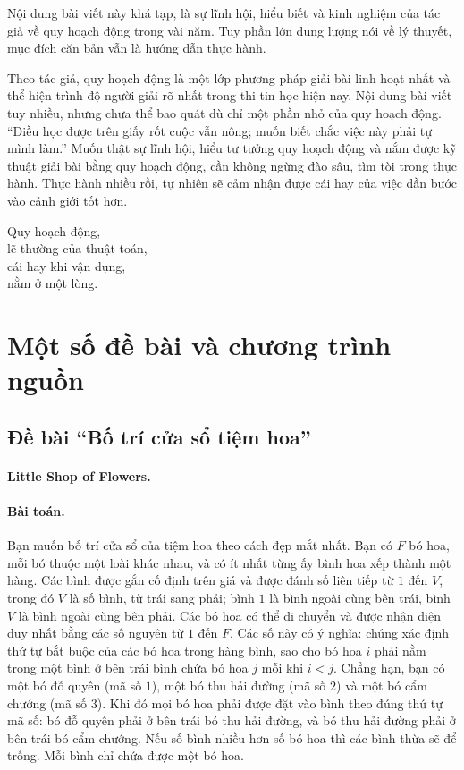 \documentclass[11pt]{article}
\begin{document}
Nội dung bài viết này khá tạp, là sự lĩnh hội, hiểu biết và kinh nghiệm của
tác giả về quy hoạch động trong vài năm. Tuy phần lớn dung lượng nói về lý
thuyết, mục đích căn bản vẫn là hướng dẫn thực hành.

Theo tác giả, quy hoạch động là một lớp phương pháp giải bài linh hoạt nhất
và thể hiện trình độ người giải rõ nhất trong thi tin học hiện nay. Nội dung
bài viết tuy nhiều, nhưng chưa thể bao quát dù chỉ một phần nhỏ của quy hoạch
động. ``Điều học được trên giấy rốt cuộc vẫn nông; muốn biết chắc việc này
phải tự mình làm.'' Muốn thật sự lĩnh hội, hiểu tư tưởng quy hoạch động và
nắm được kỹ thuật giải bài bằng quy hoạch động, cần không ngừng đào sâu, tìm
tòi trong thực hành. Thực hành nhiều rồi, tự nhiên sẽ cảm nhận được cái hay
của việc dần bước vào cảnh giới tốt hơn.

\begin{center}
Quy hoạch động,\\
lẽ thường của thuật toán,\\
cái hay khi vận dụng,\\
nằm ở một lòng.
\end{center}

\appendix
\section{Một số đề bài và chương trình nguồn}

\subsection{Đề bài ``Bố trí cửa sổ tiệm hoa''}

\paragraph{Little Shop of Flowers.}

\paragraph{Bài toán.}
Bạn muốn bố trí cửa sổ của tiệm hoa theo cách đẹp mắt nhất. Bạn có \(F\) bó
hoa, mỗi bó thuộc một loài khác nhau, và có ít nhất từng ấy bình hoa xếp
thành một hàng. Các bình được gắn cố định trên giá và được đánh số liên tiếp
từ \(1\) đến \(V\), trong đó \(V\) là số bình, từ trái sang phải; bình \(1\)
là bình ngoài cùng bên trái, bình \(V\) là bình ngoài cùng bên phải. Các bó
hoa có thể di chuyển và được nhận diện duy nhất bằng các số nguyên từ \(1\)
đến \(F\). Các số này có ý nghĩa: chúng xác định thứ tự bắt buộc của các bó
hoa trong hàng bình, sao cho bó hoa \(i\) phải nằm trong một bình ở bên trái
bình chứa bó hoa \(j\) mỗi khi \(i<j\). Chẳng hạn, bạn có một bó đỗ quyên
(mã số \(1\)), một bó thu hải đường (mã số \(2\)) và một bó cẩm chướng (mã số
\(3\)). Khi đó mọi bó hoa phải được đặt vào bình theo đúng thứ tự mã số: bó
đỗ quyên phải ở bên trái bó thu hải đường, và bó thu hải đường phải ở bên
trái bó cẩm chướng. Nếu số bình nhiều hơn số bó hoa thì các bình thừa sẽ để
trống. Mỗi bình chỉ chứa được một bó hoa.
\end{document}
